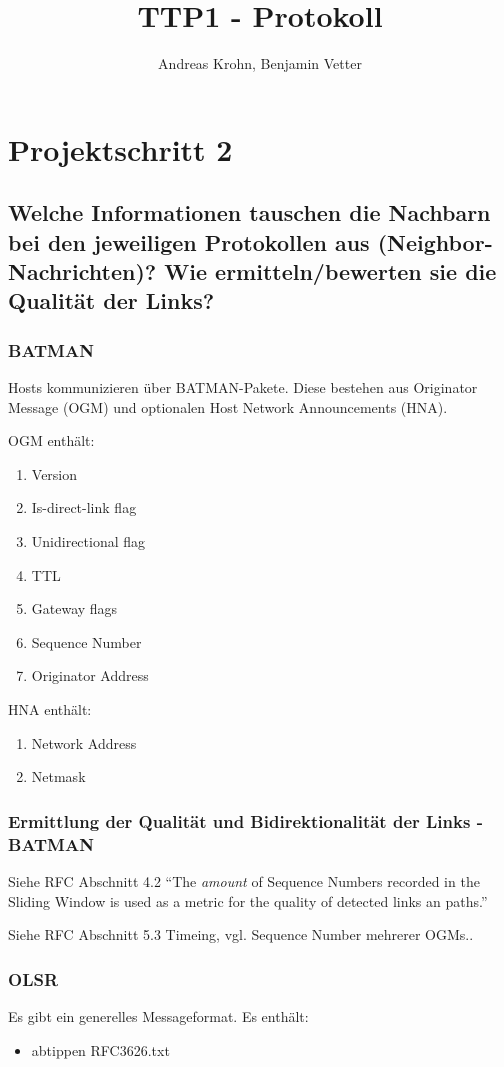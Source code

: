 \documentclass[a4paper,10pt]{article}
\title{TTP1 - Protokoll}
\author{Andreas Krohn, Benjamin Vetter}
\begin{document}
\maketitle

\section{Projektschritt 2}
\subsection{Welche Informationen tauschen die Nachbarn bei den jeweiligen Protokollen aus (Neighbor-Nachrichten)? Wie ermitteln/bewerten sie die Qualität der Links?}
\subsubsection*{BATMAN}
Hosts kommunizieren über BATMAN-Pakete. Diese bestehen aus Originator Message (OGM) und optionalen Host Network Announcements (HNA).

OGM enthält:
\begin{enumerate}
  \item Version
  \item Is-direct-link flag
  \item Unidirectional flag
  \item TTL
  \item Gateway flags
  \item Sequence Number
  \item Originator Address
\end{enumerate}
HNA enthält:
\begin{enumerate}
  \item Network Address
  \item Netmask
\end{enumerate}


\subsubsection*{Ermittlung der Qualität und Bidirektionalität der Links - BATMAN}
Siehe RFC Abschnitt 4.2 "`The \emph{amount} of Sequence Numbers recorded in the Sliding Window is used as a metric for the quality of detected links an paths."'

Siehe RFC Abschnitt 5.3 Timeing, vgl. Sequence Number mehrerer OGMs..

\subsubsection*{OLSR}
Es gibt ein generelles Messageformat. Es enthält:
\begin{itemize}
  \item abtippen RFC3626.txt
\end{itemize}
\end{document}
